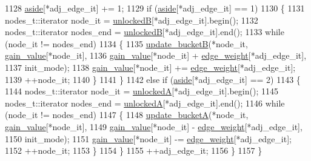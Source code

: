\begin{DoxyCode}
1128     \mbox{\hyperlink{classratio__cut__partition_a112bfcfb9d05d5bbdeb29576a61399e1}{aside}}[*adj\_edge\_it] += 1;
1129     \textcolor{keywordflow}{if} (\mbox{\hyperlink{classratio__cut__partition_a112bfcfb9d05d5bbdeb29576a61399e1}{aside}}[*adj\_edge\_it] == 1)
1130     \{
1131         nodes\_t::iterator node\_it = \mbox{\hyperlink{classratio__cut__partition_af7c877d8c6e9b533ab34cde1c6690b25}{unlockedB}}[*adj\_edge\_it].begin();
1132         nodes\_t::iterator nodes\_end = \mbox{\hyperlink{classratio__cut__partition_af7c877d8c6e9b533ab34cde1c6690b25}{unlockedB}}[*adj\_edge\_it].end();
1133         \textcolor{keywordflow}{while} (node\_it != nodes\_end)
1134         \{
1135         \mbox{\hyperlink{classratio__cut__partition_abe5d474e6d99c7bb200071d6484b5358}{update\_bucketB}}(*node\_it, \mbox{\hyperlink{classratio__cut__partition_af24ff191abbb0578f0bfc54fef5f6d45}{gain\_value}}[*node\_it],
1136             \mbox{\hyperlink{classratio__cut__partition_af24ff191abbb0578f0bfc54fef5f6d45}{gain\_value}}[*node\_it] + \mbox{\hyperlink{classratio__cut__partition_a48a85c82fb09b83c9d494d6d1232fab2}{edge\_weight}}[*adj\_edge\_it],
1137             init\_mode);
1138         \mbox{\hyperlink{classratio__cut__partition_af24ff191abbb0578f0bfc54fef5f6d45}{gain\_value}}[*node\_it] += \mbox{\hyperlink{classratio__cut__partition_a48a85c82fb09b83c9d494d6d1232fab2}{edge\_weight}}[*adj\_edge\_it];
1139         ++node\_it;
1140         \}
1141     \}
1142     \textcolor{keywordflow}{else} \textcolor{keywordflow}{if} (\mbox{\hyperlink{classratio__cut__partition_a112bfcfb9d05d5bbdeb29576a61399e1}{aside}}[*adj\_edge\_it] == 2)
1143     \{
1144         nodes\_t::iterator node\_it = \mbox{\hyperlink{classratio__cut__partition_a9e4d0ba86475bd0faa98e01c6be4dde0}{unlockedA}}[*adj\_edge\_it].begin();
1145         nodes\_t::iterator nodes\_end = \mbox{\hyperlink{classratio__cut__partition_a9e4d0ba86475bd0faa98e01c6be4dde0}{unlockedA}}[*adj\_edge\_it].end();
1146         \textcolor{keywordflow}{while} (node\_it != nodes\_end)
1147         \{
1148         \mbox{\hyperlink{classratio__cut__partition_acbd0608a7e5560a52c447711cb59a644}{update\_bucketA}}(*node\_it, \mbox{\hyperlink{classratio__cut__partition_af24ff191abbb0578f0bfc54fef5f6d45}{gain\_value}}[*node\_it],
1149             \mbox{\hyperlink{classratio__cut__partition_af24ff191abbb0578f0bfc54fef5f6d45}{gain\_value}}[*node\_it] - \mbox{\hyperlink{classratio__cut__partition_a48a85c82fb09b83c9d494d6d1232fab2}{edge\_weight}}[*adj\_edge\_it],
1150             init\_mode);
1151         \mbox{\hyperlink{classratio__cut__partition_af24ff191abbb0578f0bfc54fef5f6d45}{gain\_value}}[*node\_it] -= \mbox{\hyperlink{classratio__cut__partition_a48a85c82fb09b83c9d494d6d1232fab2}{edge\_weight}}[*adj\_edge\_it];
1152         ++node\_it;
1153         \}
1154     \}
1155     ++adj\_edge\_it;
1156     \}
1157 \}
\end{DoxyCode}
